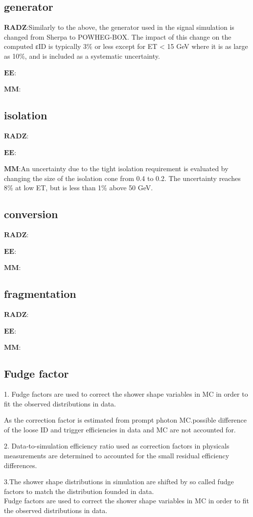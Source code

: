 \documentclass{ctexart}
\begin{document}
\subsection{generator}
$\mathbf{RADZ}$:Similarly to the above, the generator used in the signal
simulation is changed from Sherpa to POWHEG-BOX.
The impact of this change on the computed εID is typically
3\% or less except for ET < 15 GeV where it is as
large as 10\%, and is included as a systematic uncertainty.
\par$\mathbf{EE}$:
\par$\mathbf{MM}$:
\subsection{isolation}
$\mathbf{RADZ}$:
\par$\mathbf{EE}$:
\par$\mathbf{MM}$:An uncertainty due to the tight isolation requirement is
evaluated by changing the size of the isolation cone from
0.4 to 0.2. The uncertainty reaches 8\% at low ET, but is
less than 1\% above 50 GeV.
\subsection{conversion}
$\mathbf{RADZ}$:
\par$\mathbf{EE}$:
\par$\mathbf{MM}$:
\subsection{fragmentation}
$\mathbf{RADZ}$:
\par$\mathbf{EE}$:
\par$\mathbf{MM}$:
\subsection{Fudge factor}
1. Fudge factors are used to correct the shower shape variables in MC in order to fit the observed distributions in data.\par
As the correction factor is estimated from prompt photon MC.possible difference of the loose ID and trigger efficiencies in data and MC are not accounted for.\par
2. Data-to-simulation efficiency ratio used as correction factors in physicals measurements are determined to accounted for the small residual efficiency differences.\par
3.The shower shape distributions in simulation are shifted by so called  fudge factors to match the distribution founded in data.\\
Fudge factors are used to correct the shower shape variables in MC in order to fit the observed distributions in data.
\end{document}
